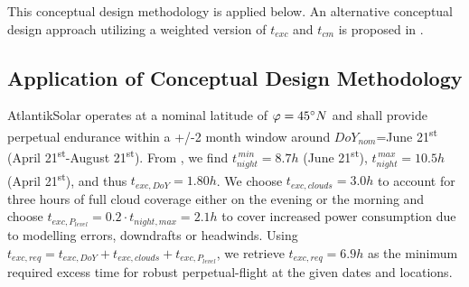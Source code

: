 This conceptual design methodology is applied below. An alternative conceptual design approach utilizing a weighted version of $t_{exc}$ and $t_{cm}$ is proposed in \cite{Morton_ICRA2013}. 

\subsection{Application of Conceptual Design Methodology} \label{sec:ConceptDesignApplication}

AtlantikSolar operates at a nominal latitude of $\varphi=45\degree N$ and shall provide perpetual endurance within a +/-2 month window around $DoY_{nom}$=June 21\textsuperscript{st} (April 21\textsuperscript{st}-August 21\textsuperscript{st}). From \cite{Duffie_SolarEngineering}, we find $t_{night}^{\,min}=8.7h$ (June 21\textsuperscript{st}), $t_{night}^{\,max}=10.5h$(April 21\textsuperscript{st}), and thus $t_{exc,DoY}=1.80h$. We choose $t_{exc,clouds}=3.0h$ to account for three hours of full cloud coverage either on the evening or the morning and choose $t_{exc,P_{level}}=0.2\cdot t_{night,max}=2.1h$ to cover increased power consumption due to modelling errors, downdrafts or headwinds. Using $t_{exc,req}=t_{exc,DoY}+t_{exc,clouds}+t_{exc,P_{level}}$, we retrieve $t_{exc,req}=6.9h$ as the minimum required excess time for robust perpetual-flight at the given dates and locations. 

